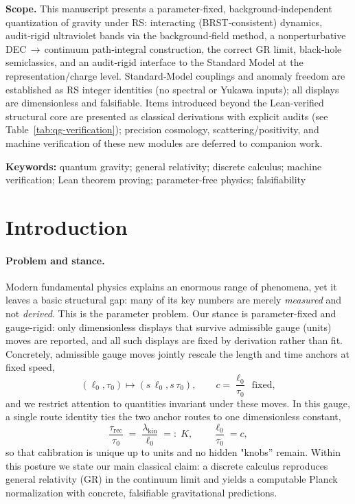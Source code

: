 \documentclass[11pt]{article}
\begin{document}
\bigskip
\noindent\textbf{Scope.} This manuscript presents a parameter‑fixed, background‑independent quantization of gravity under RS: interacting (BRST‑consistent) dynamics, audit‑rigid ultraviolet bands via the background‑field method, a nonperturbative DEC\,$\to$\,continuum path‑integral construction, the correct GR limit, black‑hole semiclassics, and an audit‑rigid interface to the Standard Model at the representation/charge level. Standard‑Model couplings and anomaly freedom are established as RS integer identities (no spectral or Yukawa inputs); all displays are dimensionless and falsifiable. Items introduced beyond the Lean‑verified structural core are presented as classical derivations with explicit audits (see Table~\ref{tab:qg-verification}); precision cosmology, scattering/positivity, and machine verification of these new modules are deferred to companion work.

\bigskip
\noindent\textbf{Keywords:} quantum gravity; general relativity; discrete calculus; machine verification; Lean theorem proving; parameter-free physics; falsifiability

\section{Introduction}

\paragraph{Problem and stance.}
Modern fundamental physics explains an enormous range of phenomena, yet it leaves a basic structural gap: many of its key numbers are merely \emph{measured} and not \emph{derived}. This is the parameter problem. Our stance is parameter-fixed and gauge-rigid: only dimensionless displays that survive admissible gauge (units) moves are reported, and all such displays are fixed by derivation rather than fit. Concretely, admissible gauge moves jointly rescale the length and time anchors at fixed speed,
\[
(\ell_0,\tau_0)\mapsto (s\,\ell_0,s\,\tau_0),\qquad c=\frac{\ell_0}{\tau_0}\ \ \text{fixed},
\]
and we restrict attention to quantities invariant under these moves. In this gauge, a single route identity ties the two anchor routes to one dimensionless constant,
\[
\frac{\tau_{\mathrm{rec}}}{\tau_0}\;=\;\frac{\lambda_{\mathrm{kin}}}{\ell_0}\;=:\;K,\qquad \frac{\ell_0}{\tau_0}=c,
\]
so that calibration is unique up to units and no hidden "knobs'' remain. Within this posture we state our main classical claim: a discrete calculus reproduces general relativity (GR) in the continuum limit and yields a computable Planck normalization with concrete, falsifiable gravitational predictions.
\end{document}
